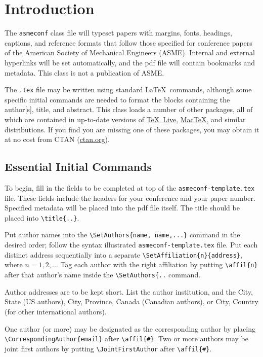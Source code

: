 \documentclass[varvw,largesc,upint,mathalfa=cal=euler,hyphenate,balance,lang-second=french,lang=english,colorlinks]{asmeconf} %
\begin{document}

\section{Introduction}
The \texttt{asmeconf} class file will typeset papers with margins, fonts, headings, captions, and reference formats that follow those specified for conference papers of the American Society of Mechanical Engineers (ASME). Internal and external hyperlinks will be set automatically, and the pdf file will contain bookmarks and metadata. This class is not a publication of ASME. 

The \texttt{.tex} file may be written using standard \LaTeX\ commands, although some specific initial commands are needed to format the blocks containing the author[s], title, and abstract.  This class loads a number of other packages, all of which are contained in up-to-date versions of \href{https://www.tug.org/texlive/}{\TeX\ Live}, \href{http://www.tug.org/mactex/}{Mac\TeX}, and similar distributions. If you find you are missing one of these packages, you may obtain it at no cost from CTAN (\href{http://ctan.org}{ctan.org}). 

\subsection{Essential Initial Commands}
To begin, fill in the fields to be completed at top of the \texttt{asmeconf-template.tex} file. These fields include the headers for your conference and your paper number. Specified metadata will be placed into the pdf file itself. 
The title should be placed into \verb|\title{..}|. 

Put author names into the \verb|\SetAuthors{name, name,...}| command in the desired order; follow the syntax illustrated \texttt{asmeconf-template.tex} file. Put each distinct address sequentially into a separate \verb|\SetAffiliation{n}{address}|, where $n = 1,2,\ldots$ Tag each author with the right affiliation by putting \verb|\affil{n}| after that author's name inside the \verb|\SetAuthors{..| command. 

Author addresses are to be kept short.  List the author institution, and the City, State (US authors), City, Province, Canada (Canadian authors), or City, Country (for other international authors). 

One author (or more) may be designated as the corresponding author by placing \verb|\CorrespondingAuthor{email}|  after \verb|\affil{#}|. Two or more authors may be joint first authors by putting \verb|\JointFirstAuthor| after \verb|\affil{#}|.
\end{document}

